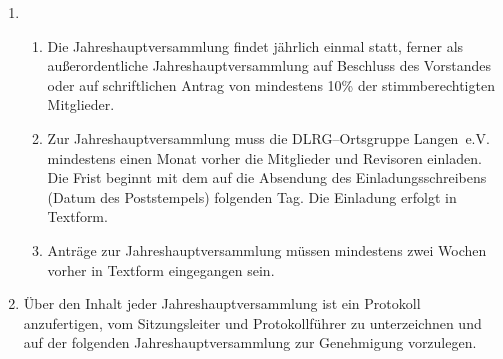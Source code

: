 \documentclass[%
12pt, %
a4paper, %
headsepline, %
footsepline, %
parskip, %
headings=normal, %
]{scrartcl}
\begin{document}
\begin{enumerate}
\begin{enumerate}[noitemsep]
      \end{enumerate}
    \item \begin{enumerate}[noitemsep]
        \item Die Jahreshauptversammlung findet jährlich einmal statt, ferner als außerordentliche Jahreshauptversammlung auf Beschluss des Vorstandes oder auf schriftlichen Antrag von mindestens 10\% der stimmberechtigten Mitglieder.
        \item Zur Jahreshauptversammlung muss die DLRG--Ortsgruppe Langen~e.V. mindestens einen Monat vorher die Mitglieder und Revisoren einladen. Die Frist beginnt mit dem auf die Absendung des Einladungsschreibens (Datum des Poststempels) folgenden Tag. Die Einladung erfolgt in Textform.
        \item Anträge zur Jahreshauptversammlung müssen mindestens zwei Wochen vorher in Textform eingegangen sein.
      \end{enumerate}
    \item Über den Inhalt jeder Jahreshauptversammlung ist ein Protokoll anzufertigen, vom Sitzungsleiter und Protokollführer zu unterzeichnen und auf der folgenden Jahreshauptversammlung zur Genehmigung vorzulegen. %
\end{enumerate}
\end{document}

